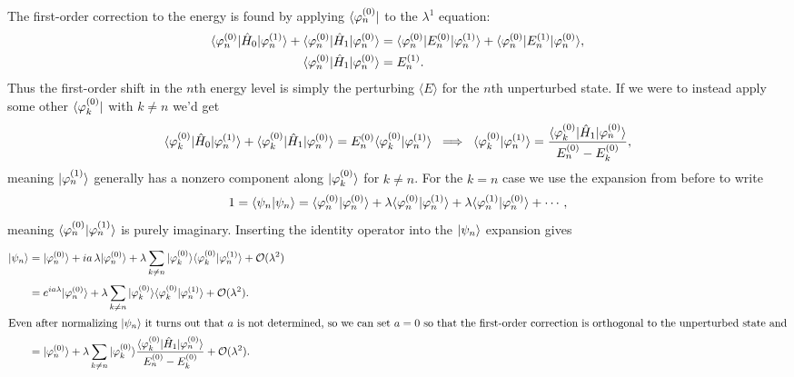 \documentclass[../p116main.tex]{subfiles}
\begin{document}
The first-order correction to the energy is found by applying $\langle{\varphi_n^{(0)}}|$ to the $\lambda^{1}$ equation:
\begin{align*}
    \langle{\varphi_n^{(0)}}| \hat H_0 |{\varphi_n^{(1)}}\rangle + \langle{\varphi_n^{(0)}}| \hat H_1 |{\varphi_n^{(0)}}\rangle &= \langle{\varphi_n^{(0)}}| E_n^{(0)} |{\varphi_n^{(1)}}\rangle + \langle{\varphi_n^{(0)}}| E_n^{(1)} |{\varphi_n^{(0)}}\rangle, \\
    \langle{\varphi_n^{(0)}}| \hat H_1 |{\varphi_n^{(0)}}\rangle &= E_n^{(1)}.
\end{align*}
Thus the first-order shift in the $n$th energy level is simply the perturbing $\langle E \rangle$ for the $n$th unperturbed state.
If we were to instead apply some other $\langle{\varphi_k^{(0)}}|$ with $k \neq n$ we'd get \vspace{-6pt}
\[ \bra{\varphi_k^{(0)}} \hat H_0 \ket{\varphi_n^{(1)}} + \bra{\varphi_k^{(0)}} \hat H_1 \ket{\varphi_n^{(0)}} = E_n^{(0)} \braket{\varphi_k^{(0)}}{\varphi_n^{(1)}} \;\implies\; \braket{\varphi_k^{(0)}}{\varphi_n^{(1)}} = \frac{\bra{\varphi_k^{(0)}} \hat H_1 \ket{\varphi_n^{(0)}}}{E_n^{(0)} - E_k^{(0)}}, \vspace{-6pt} \]
meaning $|{\varphi_n^{(1)}}\rangle$ generally has a nonzero component along $|{\varphi_k^{(0)}}\rangle$ for $k \neq n$.
For the $k=n$ case we use the expansion from before to write
\[ 1 = \langle{\psi_n}|{\psi_n}\rangle = \langle{\varphi_n^{(0)}}|{\varphi_n^{(0)}}\rangle + \lambda \langle{\varphi_n^{(0)}}|{\varphi_n^{(1)}}\rangle + \lambda \langle{\varphi_n^{(1)}}|{\varphi_n^{(0)}}\rangle + \cdots, \]
meaning $\langle{\varphi_n^{(0)}}|{\varphi_n^{(1)}}\rangle$ is purely imaginary.
Inserting the identity operator into the $|{\psi_n}\rangle$ expansion gives
\begin{align*}
    |{\psi_n}\rangle &= |{\varphi_n^{(0)}}\rangle + ia \, \lambda |{\varphi_n^{(0)}}\rangle + \lambda \sum_{k \neq n}^{} |{\varphi_k^{(0)}}\rangle \langle{\varphi_k^{(0)}}|{\varphi_n^{(1)}}\rangle + \mathcal O (\lambda^2) \\
    &= e^{ia \lambda} |{\varphi_n^{(0)}}\rangle + \lambda \sum_{k \neq n}^{} |{\varphi_k^{(0)}}\rangle \langle{\varphi_k^{(0)}}|{\varphi_n^{(1)}}\rangle + \mathcal O (\lambda^2). \\
    \intertext{Even after normalizing $|{\psi_n}\rangle$ it turns out that $a$ is not determined, so we can set $a = 0$ so that the first-order correction is orthogonal to the unperturbed state and}
    &= |{\varphi_n^{(0)}}\rangle + \lambda \sum_{k \neq n}^{} |{\varphi_k^{(0)}}\rangle \frac{\langle{\varphi_k^{(0)}}| \hat H_1 |{\varphi_n^{(0)}}\rangle}{E_n^{(0)} - E_k^{(0)}} + \mathcal O(\lambda^2).
\end{align*}
\end{document}
